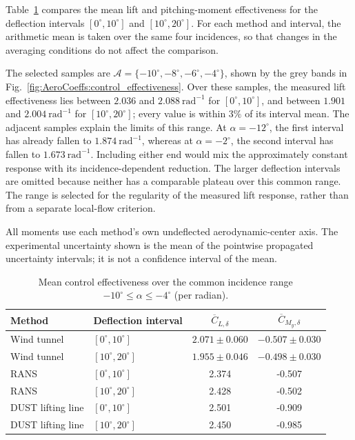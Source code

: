 \documentclass[journal ]{new-aiaa}
\begin{document}
Table~\ref{tab:control_effectiveness} compares the mean lift and pitching-moment effectiveness for the deflection intervals \([0^\circ,10^\circ]\) and \([10^\circ,20^\circ]\). For each method and interval, the arithmetic mean is taken over the same four incidences, so that changes in the averaging conditions do not affect the comparison.

The selected samples are \(\mathcal{A}=\{-10^\circ,-8^\circ,-6^\circ,-4^\circ\}\), shown by the grey bands in Fig.~\ref{fig:AeroCoeffs:control_effectiveness}.
Over these samples, the measured lift effectiveness lies between \(2.036\) and \(2.088~\mathrm{rad}^{-1}\) for \([0^\circ,10^\circ]\), and between \(1.901\) and \(2.004~\mathrm{rad}^{-1}\) for \([10^\circ,20^\circ]\); every value is within \(3\%\) of its interval mean.
The adjacent samples explain the limits of this range. At \(\alpha=-12^\circ\), the first interval has already fallen to \(1.874~\mathrm{rad}^{-1}\), whereas at \(\alpha=-2^\circ\), the second interval has fallen to \(1.673~\mathrm{rad}^{-1}\).
Including either end would mix the approximately constant response with its incidence-dependent reduction.
The larger deflection intervals are omitted because neither has a comparable plateau over this common range.
The range is selected for the regularity of the measured lift response, rather than from a separate local-flow criterion.

All moments use each method's own undeflected aerodynamic-center axis.
The experimental uncertainty shown is the mean of the pointwise propagated uncertainty intervals; it is not a confidence interval of the mean.

\begin{table}[htbp]
\centering
\caption{Mean control effectiveness over the common incidence range \(-10^\circ\leq\alpha\leq-4^\circ\) (per radian).}
\label{tab:control_effectiveness}
\begin{tabular}{llcc}
\hline\hline
Method & Deflection interval & \(\overline{C}_{L,\delta}\) & \(\overline{C}_{M_y,\delta}\) \\
\hline
Wind tunnel & \([0^\circ,10^\circ]\) & \(2.071\pm0.060\) & \(-0.507\pm0.030\) \\
Wind tunnel & \([10^\circ,20^\circ]\) & \(1.955\pm0.046\) & \(-0.498\pm0.030\) \\
\hline
RANS & \([0^\circ,10^\circ]\) & 2.374 & -0.507 \\
RANS & \([10^\circ,20^\circ]\) & 2.428 & -0.502 \\
\hline
DUST lifting line & \([0^\circ,10^\circ]\) & 2.501 & -0.909 \\
DUST lifting line & \([10^\circ,20^\circ]\) & 2.450 & -0.985 \\
\hline\hline
\end{tabular}
\end{table}
\end{document}
